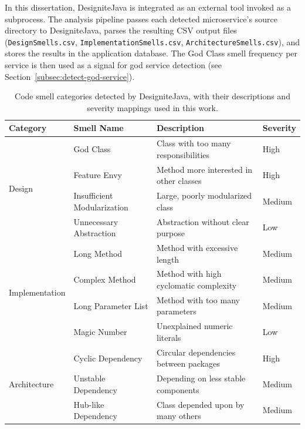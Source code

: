 In this dissertation, DesigniteJava is integrated as an external tool invoked as a subprocess. The analysis pipeline passes each detected microservice's source directory to DesigniteJava, parses the resulting CSV output files (\texttt{DesignSmells.csv}, \texttt{ImplementationSmells.csv}, \texttt{ArchitectureSmells.csv}), and stores the results in the application database. The God Class smell frequency per service is then used as a signal for god service detection (see Section~\ref{subsec:detect-god-service}).

\begin{table}[htbp]
    \centering
    \footnotesize
    \begin{tabular}{|l|l|p{5.5cm}|l|}
        \hline
        \textbf{Category} & \textbf{Smell Name} & \textbf{Description} & \textbf{Severity} \\
        \hline\hline
        \multirow{4}{*}{Design} & God Class & Class with too many responsibilities & High \\
        \cline{2-4}
        & Feature Envy & Method more interested in other classes & High \\
        \cline{2-4}
        & Insufficient Modularization & Large, poorly modularized class & Medium \\
        \cline{2-4}
        & Unnecessary Abstraction & Abstraction without clear purpose & Low \\
        \hline
        \multirow{4}{*}{Implementation} & Long Method & Method with excessive length & Medium \\
        \cline{2-4}
        & Complex Method & Method with high cyclomatic complexity & Medium \\
        \cline{2-4}
        & Long Parameter List & Method with too many parameters & Medium \\
        \cline{2-4}
        & Magic Number & Unexplained numeric literals & Low \\
        \hline
        \multirow{3}{*}{Architecture} & Cyclic Dependency & Circular dependencies between packages & High \\
        \cline{2-4}
        & Unstable Dependency & Depending on less stable components & Medium \\
        \cline{2-4}
        & Hub-like Dependency & Class depended upon by many others & Medium \\
        \hline
    \end{tabular}
    \caption{Code smell categories detected by DesigniteJava, with their descriptions and severity mappings used in this work.}
    \label{tab:code-smell-categories}
\end{table}

